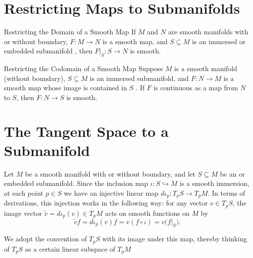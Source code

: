 \documentclass[../main.tex]{subfiles}
\begin{document}
\section{Restricting Maps to Submanifolds}

\begin{theorem}{Restricting the Domain of a Smooth Map}{}
If $M$ and $N$ are smooth manifolds with or without boundary, $F \colon M \to N$ is a smooth map, and $S \subseteq M$ is an immersed or embedded submanifold , then $F|_S \colon S \to N$ is smooth.
\end{theorem}
\begin{theorem}{Restricting the Codomain of a Smooth Map}{}
Suppose $M$ is a smooth manifold (without boundary), $S \subseteq M$ is an immersed submanifold, and $F: N \to M$ is a smooth map whose image is contained in $S$ . If $F$ is continuous as a map from $N$ to $S$, then $F: N \to S$ is smooth.
\end{theorem}

\section{The Tangent Space to a Submanifold}

\begin{definition}{}{}
    Let $M$ be a smooth manifold with or without boundary, and let $S \subseteq M$ be an  or embedded submanifold. Since the inclusion map $\iota : S \hookrightarrow M$ is a smooth immersion, at each point $p \in S$ we have an injective linear map $d\iota_{p} : T_{p}S \to T_{p}M$. In terms of derivations, this injection works in the following way: for any vector $v \in T_{p}S$, the image vector $\tilde{v} = d\iota_{p}(v) \in T_{p}M$ acts on smooth functions on $M$ by
\[
\tilde{v}f = d\iota_{p}(v)f = v(f \circ \iota) = v\bigl(f\vert_{S}\bigr).
\]
\end{definition}

\begin{remark}
We adopt the convention of  $T_{p}S$ with its image under this map, thereby thinking of $T_{p}S$ as a certain linear subspace of $T_{p}M$
\end{remark}
\end{document}
